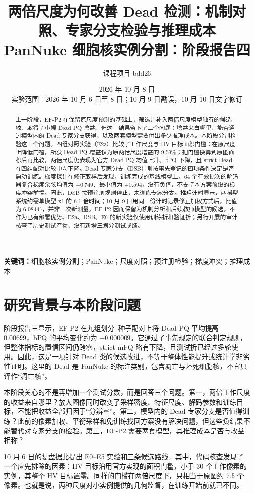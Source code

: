 \documentclass[11pt,a4paper,UTF8,fontset=fandol]{ctexart}
\title{\bfseries 两倍尺度为何改善 Dead 检测：机制对照、专家分支检验与推理成本\\[7pt]
\large PanNuke 细胞核实例分割：阶段报告四}
\author{课程项目 bdd26}
\date{2026 年 10 月 8 日\\\small 实验范围：2026 年 10 月 6 日至 8 日；10 月 9 日勘误，10 月 10 日文字修订}
\begin{document}
\maketitle

\begin{abstract}
上一阶段，EF-P2 在保留原尺度预测的基础上，筛选并补入两倍尺度模型独有的候选核，取得了小幅 Dead PQ 增益。但这一结果留下了三个问题：增益来自哪里，能否通过模型内的 Dead 专家分支获得，以及两套模型需要付出多少推理成本。本阶段分别检验这三个问题。四组对照实验（E2a）比较了工作尺度与 HV 目标面积门槛：在原尺度上降低门槛，所获 Dead PQ 增益仅为原两倍尺度增益的 9.59\%；把门槛换算到原图面积后再比较，两倍尺度仍表现为官方 Dead PQ 均值上升、bPQ 下降，且 strict Dead 在四组配对比较中均下降。Dead 专家分支（DSB）则按事先登记的四项条件决定是否启动训练。梯度探针在修正取样后发现，训练完成的基线模型上，64 个有效批次的解码器复合梯度余弦均值为 $+0.749$、最小值为 $+0.594$，没有负值，不支持本方案预设的梯度冲突前提。因此，DSB 按预注册规则停止，未训练专家分支。推理计时显示，两模型系统约需单模型 x1 的 6.1 倍时间；10 月 9 日用同一份计时记录修正加权方式后，比值为 6.08447，并非一次新测量。EF-P2 因而保留为机制分析和后续教师模型的候选，不作为已有部署优势。E2a、DSB、E0 的新实验仅使用训练折和验证折；另行开展的审计核查了历史测试产物，没有新增三划分测试成绩。
\end{abstract}
\noindent\textbf{关键词：}细胞核实例分割；PanNuke；尺度对照；预注册检验；梯度冲突；推理成本

\section{研究背景与本阶段问题}

阶段报告三显示，EF-P2 在九组划分--种子配对上将 Dead PQ 平均提高 0.00699，bPQ 的平均变化约为 $-0.000009$\cite{reports}。它通过了事先规定的联合判定规则，但整体指标的置信区间仍跨零，strict mPQ 略有下降，且测试折已经过多轮使用。因此，这是一项针对 Dead 类的候选改进，不等于整体性能提升或统计学非劣性证明。这里的 Dead 是 PanNuke 的标注类别，包含凋亡与坏死细胞核，不宜只译作“凋亡核”。

本阶段关心的不是再增加一个测试分数，而是回答三个问题。第一，两倍工作尺度的收益来自哪里？放大图像同时改变了采样密度、特征尺度、解码参数和训练目标，不能把收益全部归因于“分辨率”。第二，模型内的 Dead 专家分支是否值得训练？此前的像素加权、平衡采样和免训练找回方案没有解决问题，但这些负结果不能替代对专家分支的检验。第三，EF-P2 需要两套模型，其推理成本是否与收益相称？

10 月 6 日的复盘据此提出 E0--E5 实验和三条候选路线\cite{next}。其中，代码核查发现了一个应先排除的因素：HV 目标沿用官方实现的面积门槛，小于 30 个工作像素的实例，其整个 HV 目标置零。同样的门槛在两倍尺度下，只相当于原图约 7.5 个像素。也就是说，两种尺度对小实例提供的几何监督，在训练开始前就已不同。
\end{document}
